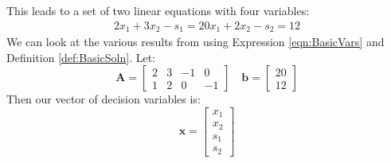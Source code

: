 \begin{example}
This leads to a set of two linear equations with four variables:
\begin{gather*}
2x_1 + 3x_2 - s_1 = 20
x_1 + 2x_2 - s_2 = 12
\end{gather*} 
We can look at the various results from using Expression \ref{eqn:BasicVars} and Definition \ref{def:BasicSoln}. Let:
\begin{equation}
\mathbf{A} = \begin{bmatrix}
2 & 3 & -1 & 0\\
1 & 2 & 0 & -1
\end{bmatrix}\quad
\mathbf{b} = \begin{bmatrix}20\\12\end{bmatrix}
\end{equation}
Then our vector of decision variables is:
\begin{equation}
\mathbf{x} = \begin{bmatrix}x_1\\x_2\\s_1\\s_2\end{bmatrix}
\end{equation}


\end{example}
